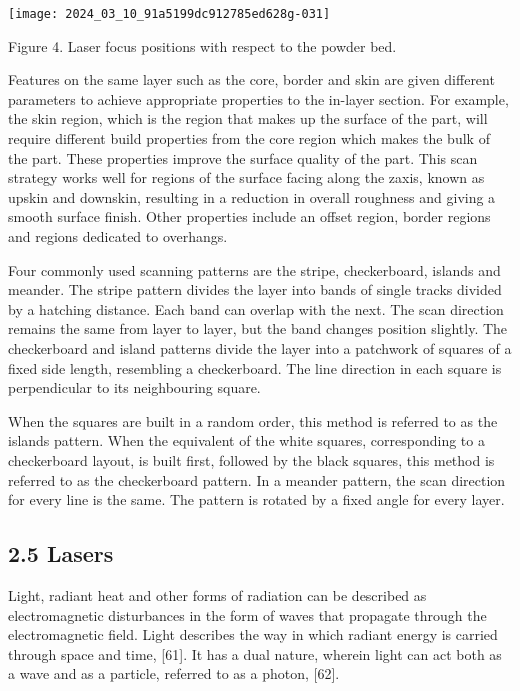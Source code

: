 \documentclass[10pt]{article}
\begin{document}
\begin{center}
\texttt{[image: 2024\_03\_10\_91a5199dc912785ed628g-031]}
\end{center}

Figure 4. Laser focus positions with respect to the powder bed.

Features on the same layer such as the core, border and skin are given different parameters to achieve appropriate properties to the in-layer section. For example, the skin region, which is the region that makes up the surface of the part, will require different build properties from the core region which makes the bulk of the part. These properties improve the surface quality of the part. This scan strategy works well for regions of the surface facing along the zaxis, known as upskin and downskin, resulting in a reduction in overall roughness and giving a smooth surface finish. Other properties include an offset region, border regions and regions dedicated to overhangs.

Four commonly used scanning patterns are the stripe, checkerboard, islands and meander. The stripe pattern divides the layer into bands of single tracks divided by a hatching distance. Each band can overlap with the next. The scan direction remains the same from layer to layer, but the band changes position slightly. The checkerboard and island patterns divide the layer into a patchwork of squares of a fixed side length, resembling a checkerboard. The line direction in each square is perpendicular to its neighbouring square.

When the squares are built in a random order, this method is referred to as the islands pattern. When the equivalent of the white squares, corresponding to a checkerboard layout, is built first, followed by the black squares, this method is referred to as the checkerboard pattern. In a meander pattern, the scan direction for every line is the same. The pattern is rotated by a fixed angle for every layer.

\subsection*{2.5 Lasers}
Light, radiant heat and other forms of radiation can be described as electromagnetic disturbances in the form of waves that propagate through the electromagnetic field. Light describes the way in which radiant energy is carried through space and time, [61]. It has a dual nature, wherein light can act both as a wave and as a particle, referred to as a photon, [62].
\end{document}
